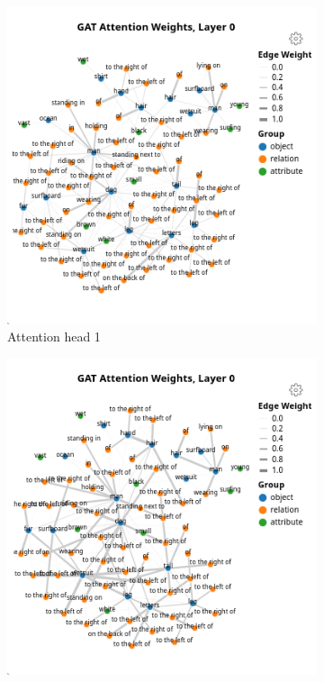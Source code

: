 
\begin{figure}[htbp]
    \centering
    \begin{subfigure}[l]{0.49\textwidth}
        \includegraphics[width=\textwidth]{figures/positive_logical/positive_logical_gat_l0_h0.png}
        \caption{Attention head 1}
    \end{subfigure}
    \begin{subfigure}[r]{0.49\textwidth}
        \includegraphics[width=\textwidth]{figures/positive_logical/positive_logical_gat_l0_h1.png}

\end{subfigure}
\end{figure}
